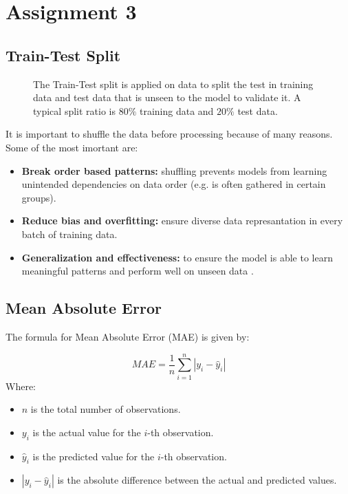 \documentclass{article}
\begin{document}
\newpage

\section{Assignment 3}
\subsection{Train-Test Split}

\begin{figure}[h]
\centering
{}
    \caption{The Train-Test split is applied on data to split the test in training data and test data that is unseen to the model to validate it. A typical split ratio is $80\%$ training data and $20\%$ test data. }
\end{figure}
It is important to shuffle the data before processing because of many reasons. Some of the most imortant are: 
\begin{itemize}
    \item \textbf{Break order based patterns:} shuffling prevents models from learning unintended dependencies on data order (e.g. is often gathered in certain groups).
    \item \textbf{Reduce bias and overfitting:} ensure diverse data represantation in every batch of training data.
    \item \textbf{Generalization and effectiveness:} to ensure the model is able to learn meaningful patterns and perform well on unseen data .
\end{itemize}
\subsection{Mean Absolute Error}

The formula for Mean Absolute Error (MAE) is given by:

\[MAE = \frac{1}{n} \sum_{i=1}^{n} | y_i - \hat{y}_i |\]
Where:
\begin{itemize}
    \item \(n\) is the total number of observations.
    \item \(y_i\) is the actual value for the \(i\)-th observation.
    \item \(\hat{y}_i\) is the predicted value for the \(i\)-th observation.
    \item \( | y_i - \hat{y}_i | \) is the absolute difference between the actual and predicted values.
\end{itemize}
\end{document}

